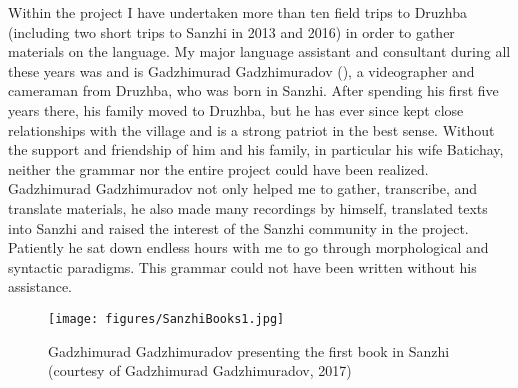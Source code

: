 Within the project I have undertaken more than ten field trips to Druzhba (including two short trips to Sanzhi in 2013 and 2016) in order to gather materials on the language. My major language assistant and consultant during all these years was and is Gadzhimurad Gadzhimuradov (), a videographer and cameraman from Druzhba, who was born in Sanzhi. After spending his first five years there, his family moved to Druzhba, but he has ever since kept close relationships with the village and is a strong patriot in the best sense. Without the support and friendship of him and his family, in particular his wife Batichay, neither the grammar nor the entire project could have been realized. Gadzhimurad Gadzhimuradov not only helped me to gather, transcribe, and translate materials, he also made many recordings by himself, translated texts into Sanzhi and raised the interest of the Sanzhi community in the project. Patiently he sat down endless hours with me to go through morphological and syntactic paradigms. This grammar could not have been written without his assistance.

\begin{figure}
	\caption{Gadzhimurad Gadzhimuradov presenting the first book in Sanzhi (courtesy of Gadzhimurad Gadzhimuradov, 2017)}
	\label{fig:SanzhiBook}
	\texttt{[image: figures/SanzhiBooks1.jpg]}
\end{figure}
